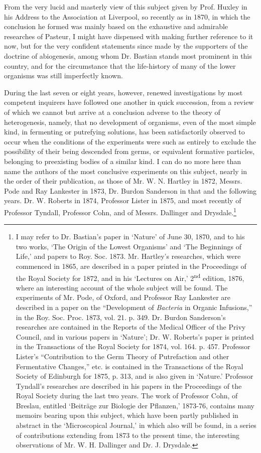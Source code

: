 \documentclass[a4paper, 11pt, oneside, english]{article}
\begin{document}
From the very lucid and masterly view of this subject given by Prof. Huxley in his Address to the Association at Liverpool, so recently as in 1870, in which the conclusion he formed was mainly based on the exhaustive and admirable researches of Pasteur, I might have dispensed with making further reference to it now, but for the very confident statements since made by the supporters of the doctrine of abiogenesis, among whom Dr. Bastian stands most prominent in this country, and for the circumstance that the life-history of many of the lower organisms was still imperfectly known.

During the last seven or eight years, however, renewed investigations by most competent inquirers have followed one another in quick succession, from a review of which we cannot but arrive at a conclusion adverse to the theory of heterogenesis, namely, that no development of organisms, even of the most simple kind, in fermenting or putrefying solutions, has been satisfactorily observed to occur when the conditions of the experiments were such as entirely to exclude the possibility of their being descended from germs, or equivalent formative particles, belonging to preexisting bodies of a similar kind. I can do no more here than name the authors of the most conclusive experiments on this subject, nearly in the order of their publication, as those of Mr. W. N. Hartley in 1872, Messrs. Pode and Ray Lankester in 1873, Dr. Burdon Sanderson in that and the following years. Dr. W. Roberts in 1874, Professor Lister in 1875, and most recently of Professor Tyndall, Professor Cohn, and of Messrs. Dallinger and Drysdale.\footnote{I may refer to Dr. Bastian's paper in `Nature' of June 30, 1870, and to his two works, `The Origin of the Lowest Organisms' and `The Beginnings of Life,' and papers to Roy. Soc. 1873. Mr. Hartley's researches, which were commenced in 1865, are described in a paper printed in the Proceedings of the Royal Society for 1872, and in his `Lectures on Air,' 2\textsuperscript{nd} edition, 1876, where an interesting account of the whole subject will be found. The experiments of Mr. Pode, of Oxford, and Professor Ray Lankester are described in a paper on the ``Development of \emph{Bacteria} in Organic Infusions,'' in the Roy. Soc. Proc. 1873, vol. 21. p. 349. Dr. Burdon Sanderson's researches are contained in the Reports of the Medical Officer of the Privy Council, and in various papers in `Nature'; Dr. W. Roberts's paper is printed in the Transactions of the Royal Society for 1874, vol. 164. p. 457. Professor Lister's ``Contribution to the Germ Theory of Putrefaction and other Fermentative Changes,'' etc. is contained in the Transactions of the Royal Society of Edinburgh for 1875, p. 313, and is also given in `Nature.' Professor Tyndall's researches are described in his papers in the Proceedings of the Royal Society during the last two years. The work of Professor Cohn, of Breslau, entitled `Beiträge zur Biologie der Pflanzen,' 1873-76, contains many memoirs bearing upon this subject, which have been partly published in abstract in the `Microscopical Journal,' in which also will be found, in a series of contributions extending from 1873 to the present time, the interesting observations of Mr. W. H. Dallinger and Dr. J. Drysdale.}
\end{document}
